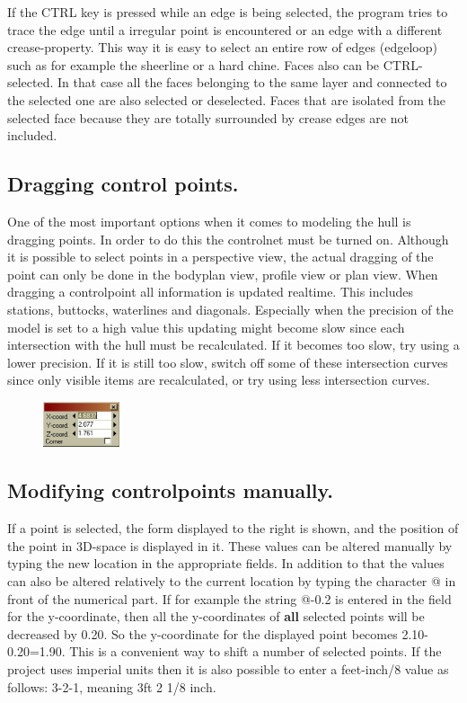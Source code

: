 \documentclass[12pt]{article}
\begin{document}
If the CTRL key is pressed while an edge is being selected, the
program tries to trace the edge until a irregular point is encountered
or an edge with a different crease-property. This way it is easy to
select an entire row of edges (edgeloop) such as for example the
sheerline or a hard chine.  Faces also can be CTRL-selected. In that
case all the faces belonging to the same layer and connected to the
selected one are also selected or deselected. Faces that are isolated
from the selected face because they are totally surrounded by crease
edges are not included.

\subsection{Dragging control points.}
One of the most important options when it comes to modeling the hull
is dragging points. In order to do this the controlnet must be turned
on. Although it is possible to select points in a perspective view,
the actual dragging of the point can only be done in the bodyplan
view, profile view or plan view. When dragging a controlpoint all
information is updated realtime. This includes stations, buttocks,
waterlines and diagonals. Especially when the precision of the model
is set to a high value this updating might become slow since each
intersection with the hull must be recalculated. If it becomes too
slow, try using a lower precision. If it is still too slow, switch off
some of these intersection curves since only visible items are
recalculated, or try using less intersection curves.

\begin{figure}
        \centering
        \includegraphics[width=0.2\textwidth,natwidth=277,natheight=165]{pointdialog.png}
        \caption{}
        \label{fig:pointdialog}
\end{figure}

\subsection{Modifying controlpoints manually.}
If a point is selected, the form displayed to the right is shown, and
the position of the point in 3D-space is displayed in it. These values
can be altered manually by typing the new location in the appropriate
fields. In addition to that the values can also be altered relatively
to the current location by typing the character @ in front of the
numerical part. If for example the string @-0.2 is entered in the
field for the y-coordinate, then all the y-coordinates of \textbf{all}
selected points will be decreased by 0.20. So the y-coordinate for the
displayed point becomes 2.10-0.20=1.90. This is a convenient way to
shift a number of selected points. If the project uses imperial units
then it is also possible to enter a feet-inch/8 value as follows:
3-2-1, meaning 3ft 2 1/8 inch.
\end{document}
